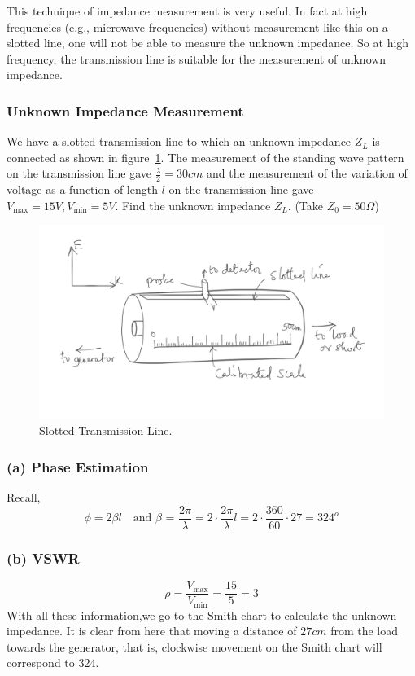 This technique of impedance measurement is very useful. In fact at high frequencies (e.g., microwave frequencies) without measurement like this on a slotted line, one will not be able to measure the unknown impedance. So at high frequency, the transmission line is suitable for the measurement of unknown impedance.

\begin{exmp}
\subsubsection*{Unknown Impedance Measurement}
We have a slotted transmission line to which an unknown impedance $Z_L$ is connected as shown in figure~\ref{fig:fig3}. The measurement of the standing wave pattern on the transmission line gave $\frac{\lambda}{2}=30cm$ and the measurement of the variation of voltage as a function of length $l$ on the transmission line gave $V_\max=15V,V_\min=5V$. Find the unknown impedance $Z_L$. (Take $Z_0 = 50\varOmega$)
\begin{figure}[h]
\centering
\includegraphics[width=1\linewidth]{./graphics/slotted_line_problem_temp}
\caption{Slotted Transmission Line.}
\label{fig:fig3}
\end{figure}

\subsubsection*{(a) Phase Estimation}
Recall,
\begin{dmath*}
\phi=2\beta l\quad\text{and }\beta\text{ = }\dfrac{2\pi}{\lambda}
=2\cdot\dfrac{2\pi}{\lambda} l
=2\cdot\dfrac{360}{60}\cdot27
=324^{o}
\end{dmath*}
\subsubsection*{(b) VSWR}
\begin{equation*}
\rho=\frac{V_\max}{V_\min}=\frac{15}{5}=3
\end{equation*}
With all these information,we go to the Smith chart to calculate the unknown impedance. It is clear from here that moving a distance of $27cm$ from the load towards the generator, that is, clockwise movement on the Smith chart will correspond to 324\textdegree.


\end{exmp}
